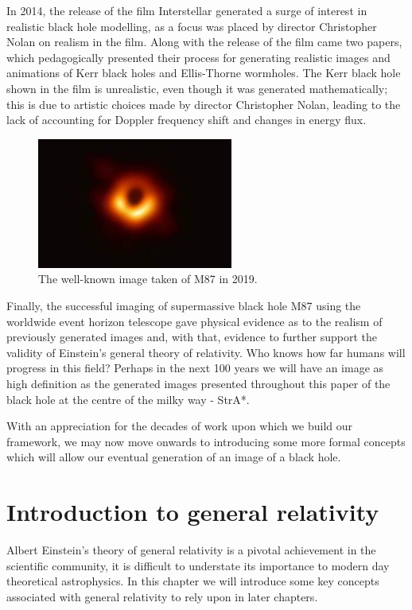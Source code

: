 \documentclass[oneside,openright,frontopenright, singlespacing]{dmathesis}
\begin{document}
\vspace{1em}
	In 2014, the release of the film Interstellar generated a surge of interest in realistic black hole modelling, as a focus was placed by director Christopher Nolan on realism in the film. Along with the release of the film came two papers\cite{thorne2015gravitational}\cite{thorne2015visualizing}, which pedagogically presented their process for generating realistic images and animations of Kerr black holes and Ellis-Thorne wormholes. The Kerr black hole shown in the film is unrealistic, even though it was generated mathematically; this is due to artistic choices made by director Christopher Nolan, leading to the lack of accounting for Doppler frequency shift and changes in energy flux.

\begin{figure}[!ht]
	\centering
	\includegraphics[width=0.5\linewidth]{img/M87}
	\caption{The well-known image taken of M87 in 2019\cite{event2019first}.}
	\label{fig:Figure1.3}
\end{figure}

\vspace{1em}
	Finally, the successful imaging of supermassive black hole M87 using the worldwide event horizon telescope\cite{event2019first} gave physical evidence as to the realism of previously generated images and, with that, evidence to further support the validity of Einstein's general theory of relativity. Who knows how far humans will progress in this field? Perhaps in the next 100 years we will have an image as high definition as the generated images presented throughout this paper of the black hole at the centre of the milky way - StrA*.

\vspace{1em}
	With an appreciation for the decades of work upon which we build our framework, we may now move onwards to introducing some more formal concepts which will allow our eventual generation of an image of a black hole.





\chapter{Introduction to general relativity}\label{chap:Chapter2}
	Albert Einstein’s theory of general relativity is a pivotal achievement in the scientific community, it is difficult to understate its importance to modern day theoretical astrophysics. In this chapter we will introduce some key concepts associated with general relativity to rely upon in later chapters.
\end{document}
